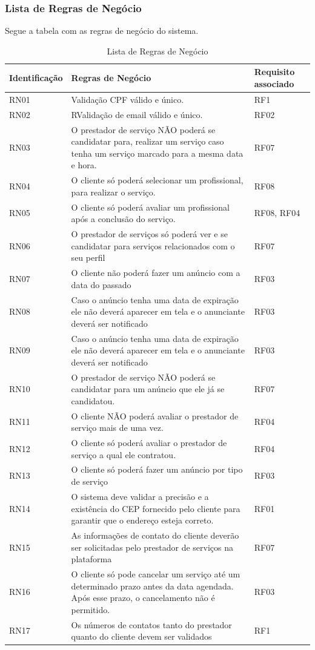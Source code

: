 \subsubsection{ Lista de Regras de Negócio}
Segue a tabela com as regras de negócio do sistema.

\begin{table}[htb]
	\centering
	\caption{\label{Formatação do texto.}Lista de Regras de Negócio}
	\begin{tabular}{|l|p{8cm}|p{3cm}|}
		\hline
		\textbf{Identificação} & \textbf{Regras de Negócio} & \textbf{Requisito associado} \\ \hline
		RN01 & Validação CPF válido e único. & RF1 \\ \hline
		RN02 & RValidação de email válido e único. & RF02 \\ \hline
		RN03 & O prestador de serviço NÃO poderá se candidatar para, realizar um serviço caso tenha um serviço marcado para a mesma data e hora. & RF07 \\ \hline
		RN04 & O cliente só poderá selecionar um profissional, para realizar o serviço. & RF08 \\ \hline
		RN05 & O cliente só poderá avaliar um profissional após a conclusão do serviço. & RF08, RF04 \\ \hline
		RN06 & O prestador de serviços só poderá ver e se candidatar para serviços relacionados com o seu perfil  & RF07 \\ \hline
		RN07 & O cliente não poderá fazer um anúncio com a data do passado  & RF03 \\ \hline
		RN08 & Caso o anúncio tenha uma data de expiração ele não deverá aparecer em tela e o anunciante deverá ser notificado & RF03 \\ \hline
		RN09 & Caso o anúncio tenha uma data de expiração ele não deverá aparecer em tela e o anunciante deverá ser notificado & RF03 \\ \hline
		RN10 & O prestador de serviço NÃO poderá se candidatar para um anúncio que ele já se candidatou.  & RF07 \\ \hline
		RN11 & O cliente NÃO poderá avaliar o prestador de serviço  mais de uma vez.  & RF04 \\ \hline
		RN12 & O cliente só poderá avaliar o prestador de serviço a qual ele contratou.  & RF04 \\ \hline
		RN13 & O cliente só poderá fazer um anúncio por tipo de serviço  & RF03 \\ \hline
		RN14 & O sistema deve validar a precisão e a existência do CEP fornecido pelo cliente para garantir que o endereço esteja correto.  & RF01 \\ \hline
		RN15 & As informações de contato do cliente deverão ser solicitadas pelo prestador de serviços na plataforma  & RF07 \\  \hline
		RN16 & O cliente só pode cancelar um serviço até um determinado prazo antes da data agendada. Após esse prazo, o cancelamento não é permitido.  & RF03 \\ \hline
		RN17 & Os números de contatos tanto do prestador quanto do cliente devem ser validados &  RF1 \\ \hline


\end{tabular}
\end{table}
